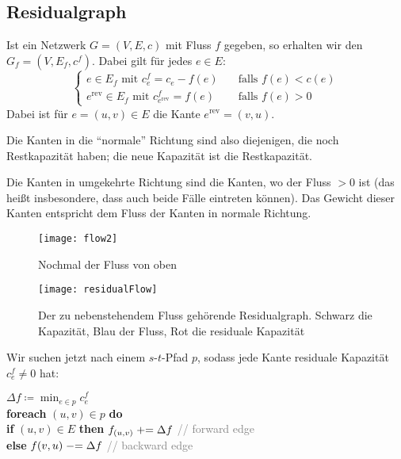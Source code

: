 \subsection{Residualgraph}

Ist ein Netzwerk \( G = (V, E, c) \) mit Fluss \( f \) gegeben, so erhalten wir den  \( G_f = (V, E_f, c^f) \). Dabei gilt für jedes \( e \in E \):
\begin{equation*}
  \begin{cases}
    e \in E_f \text{ mit } c_e^f = c_e - f(e) \quad &\text{falls } f(e) < c(e)  \\
    e^\text{rev} \in E_f \text{ mit } c_{e^\text{rev}}^f = f(e) \quad &\text{falls } f(e) > 0
  \end{cases}
\end{equation*}
Dabei ist für \( e = (u,v) \in E \) die Kante \( e^\text{rev} = (v,u) \).

Die Kanten in die ``normale'' Richtung sind also diejenigen, die noch Restkapazität haben; die neue Kapazität ist die Restkapazität.

Die Kanten in umgekehrte Richtung sind die Kanten, wo der Fluss \( > 0 \) ist (das heißt insbesondere, dass auch beide Fälle eintreten können). Das Gewicht dieser Kanten entspricht dem Fluss der Kanten in normale Richtung.

\begin{minipage}{.475\textwidth}
  \begin{figure}[H]
    \texttt{[image: flow2]}
    \caption{Nochmal der Fluss von oben}
  \end{figure}
\end{minipage}
\hfill
\begin{minipage}{.475\textwidth}
  \vspace{6.8mm}
  \begin{figure}[H]
    \texttt{[image: residualFlow]}
    \caption{Der zu nebenstehendem Fluss gehörende Residualgraph. Schwarz die Kapazität, Blau der Fluss, Rot die residuale Kapazität}
  \end{figure}
\end{minipage}

Wir suchen jetzt nach einem \( s \)-\( t \)-Pfad \( p \), sodass jede Kante residuale Kapazität \( c_e^f \neq 0 \) hat:

\begin{pseudocode}
  \( \Delta f \coloneqq \min_{e \in p}c_e^f \) \\
  \textbf{foreach} \( (u,v) \in p \) \textbf{do} \\
  \phantom{\enskip} \textbf{if} \( (u,v) \in E \) \textbf{then} \( f_{(u,v)} \mathrel{+}= \Delta f \) \enskip{} \textcolor{gray}{// forward edge} \\
  \phantom{\enskip} \textbf{else} \( f{(v,u)} \mathrel{-}= \Delta f \) \enskip{} \textcolor{gray}{// backward edge} 
\end{pseudocode}

